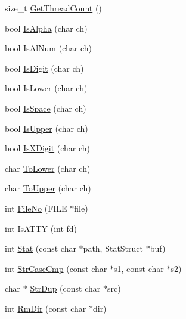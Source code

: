 \begin{DoxyCompactItemize}
\item 
size\-\_\-t \hyperlink{namespacetesting_1_1internal_a1a64b279303ddd2280b7d7530f229daf}{\-Get\-Thread\-Count} ()
\item 
bool \hyperlink{namespacetesting_1_1internal_a820f82d00f792823c4ee5a7e8792d494}{\-Is\-Alpha} (char ch)
\item 
bool \hyperlink{namespacetesting_1_1internal_a86fb084b0b7eb55a84127f09f100d6ca}{\-Is\-Al\-Num} (char ch)
\item 
bool \hyperlink{namespacetesting_1_1internal_a14c103337b15023af223d62660d4412b}{\-Is\-Digit} (char ch)
\item 
bool \hyperlink{namespacetesting_1_1internal_a126278db8321717abc305370708e81c3}{\-Is\-Lower} (char ch)
\item 
bool \hyperlink{namespacetesting_1_1internal_ac2774601e1c8d09df5179723a5cecf69}{\-Is\-Space} (char ch)
\item 
bool \hyperlink{namespacetesting_1_1internal_a1687fe200fe268dc61a8cca69d84b81c}{\-Is\-Upper} (char ch)
\item 
bool \hyperlink{namespacetesting_1_1internal_a5611e6f84ecc52b421d9cd22f7e7842a}{\-Is\-X\-Digit} (char ch)
\item 
char \hyperlink{namespacetesting_1_1internal_a667501a50067ea0bc29309bd1d890676}{\-To\-Lower} (char ch)
\item 
char \hyperlink{namespacetesting_1_1internal_a8cdfff015b1271c328288e3880e1dc4d}{\-To\-Upper} (char ch)
\item 
int \hyperlink{namespacetesting_1_1internal_1_1posix_ad74bd19d3fa41052bbd53ec4ead31880}{\-File\-No} (\-F\-I\-L\-E $\ast$file)
\item 
int \hyperlink{namespacetesting_1_1internal_1_1posix_a95de7f4c27e0ed8d1b8a2dae5b8cd4aa}{\-Is\-A\-T\-T\-Y} (int fd)
\item 
int \hyperlink{namespacetesting_1_1internal_1_1posix_a2b61bd7c4e89210f1b7ef8be3decf6c8}{\-Stat} (const char $\ast$path, \-Stat\-Struct $\ast$buf)
\item 
int \hyperlink{namespacetesting_1_1internal_1_1posix_a4f3409b17d947f9e3a8f45d82ef6c862}{\-Str\-Case\-Cmp} (const char $\ast$s1, const char $\ast$s2)
\item 
char $\ast$ \hyperlink{namespacetesting_1_1internal_1_1posix_a95b18e04f2142b9e775030b633edc851}{\-Str\-Dup} (const char $\ast$src)
\item 
int \hyperlink{namespacetesting_1_1internal_1_1posix_ab1b01a6ad8be63acf95b6ab74b517ec3}{\-Rm\-Dir} (const char $\ast$dir)
\item 

\end{DoxyCompactItemize}

